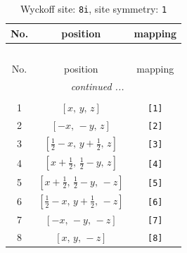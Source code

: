 \documentclass[fleqn,8pt]{jsarticle}
\begin{document}
\renewcommand{\arraystretch}{1.2}
\begin{longtable}{ccc}
\caption{Wyckoff site: {\tt 8i}, site symmetry: {\tt 1}}
 \\
 \hline \hline
No. & position & mapping \\ \hline \endfirsthead

\multicolumn{2}{l}{\tablename\ \thetable{}} \\
 \hline \hline
No. & position & mapping \\ \hline \endhead

 \hline \hline
\multicolumn{2}{r}{\footnotesize\it continued ...} \\ \endfoot

 \hline \hline
\multicolumn{2}{r}{} \\ \endlastfoot

1 & $\left[ x,\, y,\, z \right]$ & {\tt [1]} \\ \hline
2 & $\left[ - x,\, - y,\, z \right]$ & {\tt [2]} \\ \hline
3 & $\left[ \frac{1}{2} - x,\, y + \frac{1}{2},\, z \right]$ & {\tt [3]} \\ \hline
4 & $\left[ x + \frac{1}{2},\, \frac{1}{2} - y,\, z \right]$ & {\tt [4]} \\ \hline
5 & $\left[ x + \frac{1}{2},\, \frac{1}{2} - y,\, - z \right]$ & {\tt [5]} \\ \hline
6 & $\left[ \frac{1}{2} - x,\, y + \frac{1}{2},\, - z \right]$ & {\tt [6]} \\ \hline
7 & $\left[ - x,\, - y,\, - z \right]$ & {\tt [7]} \\ \hline
8 & $\left[ x,\, y,\, - z \right]$ & {\tt [8]} \\
\end{longtable}
\end{document}

